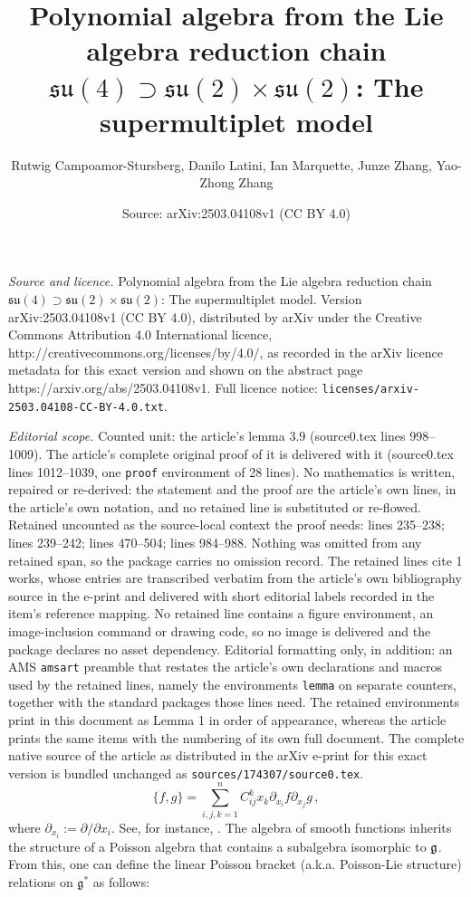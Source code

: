 \documentclass[10pt,a4paper]{amsart}
\title{Polynomial algebra from the Lie algebra reduction chain $\mathfrak{su}(4) \supset \mathfrak{su}(2) \times \mathfrak{su}(2)$: The supermultiplet model}
\author{Rutwig Campoamor-Stursberg, Danilo Latini, Ian Marquette, Junze Zhang, Yao-Zhong Zhang}
\date{Source: arXiv:2503.04108v1 (CC BY 4.0)}
\begin{document}
\maketitle

\noindent\emph{Source and licence.} Polynomial algebra from the Lie algebra reduction chain $\mathfrak{su}(4) \supset \mathfrak{su}(2) \times \mathfrak{su}(2)$: The supermultiplet model. Version arXiv:2503.04108v1 (CC BY 4.0), distributed by arXiv under the Creative Commons Attribution 4.0 International licence, http://creativecommons.org/licenses/by/4.0/, as recorded in the arXiv licence metadata for this exact version and shown on the abstract page https://arxiv.org/abs/2503.04108v1. Full licence notice: \texttt{licenses/arxiv-2503.04108-CC-BY-4.0.txt}.\par\smallskip

\noindent\textit{Editorial scope.} Counted unit: the article's lemma 3.9 (source0.tex lines 998--1009). The article's complete original proof of it is delivered with it (source0.tex lines 1012--1039, one \texttt{proof} environment of 28 lines). No mathematics is written, repaired or re-derived: the statement and the proof are the article's own lines, in the article's own notation, and no retained line is substituted or re-flowed.  Retained uncounted as the source-local context the proof needs: lines 235--238; lines 239--242; lines 470--504; lines 984--988.  Nothing was omitted from any retained span, so the package carries no omission record.  The retained lines cite 1 works, whose entries are transcribed verbatim from the article's own bibliography source in the e-print and delivered with short editorial labels recorded in the item's reference mapping.  No retained line contains a figure environment, an image-inclusion command or drawing code, so no image is delivered and the package declares no asset dependency.  Editorial formatting only, in addition: an AMS \texttt{amsart} preamble that restates the article's own declarations and macros used by the retained lines, namely the environments \texttt{lemma} on separate counters, together with the standard packages those lines need.  The retained environments print in this document as Lemma 1 in order of appearance, whereas the article prints the same items with the numbering of its own full document.  The complete native source of the article as distributed in the arXiv e-print for this exact version is bundled unchanged as \texttt{sources/174307/source0.tex}.
\begin{equation}
	\{f,g\}=\sum_{i,j,k=1}^n C_{ij}^k x_k \partial_{x_i} f \partial_{x_j} g  \, ,
	\label{FPB}
\end{equation} where $\partial_{x_i} := \partial/\partial x_i.$ See, for instance, \cite{MR2906391}.  The algebra of smooth functions inherits the structure of a Poisson algebra that contains a subalgebra isomorphic to $\frak{g}$.  From this, one can define the linear Poisson bracket (a.k.a. Poisson-Lie structure) relations on $\mathfrak{g}^*$ as follows:
\end{document}
